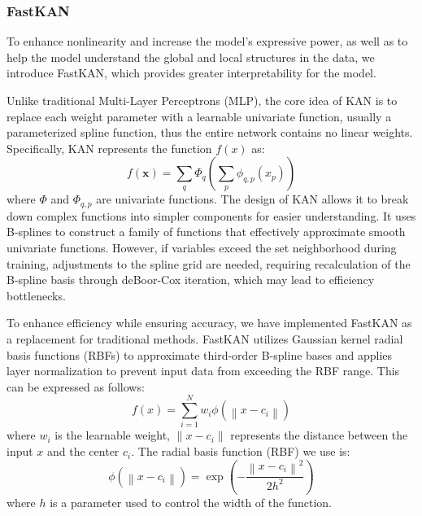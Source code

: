 \documentclass[a4paper,fleqn]{cas-dc}
\begin{document}
\subsubsection{FastKAN}
To enhance nonlinearity and increase the model's expressive power, as well as to help the model understand the global and local structures in the data, we introduce FastKAN\cite{li2024kolmogorovarnoldnetworksradialbasis}, which provides greater interpretability for the model.

Unlike traditional Multi-Layer Perceptrons (MLP)\cite{taud2018multilayer}, the core idea of KAN\cite{liu2024kankolmogorovarnoldnetworks} is to replace each weight parameter with a learnable univariate function, usually a parameterized spline function, thus the entire network contains no linear weights. Specifically, KAN represents the function \( f(x) \) as:
\begin{equation}
	f(\mathbf{x}) = \sum_q \Phi_q \left( \sum_p \phi_{q,p}(x_p) \right)
\end{equation} 
where \( \Phi \) and \( \Phi_{q,p} \) are univariate functions.
The design of KAN allows it to break down complex functions into simpler components for easier understanding. It uses B-splines to construct a family of functions that effectively approximate smooth univariate functions. However, if variables exceed the set neighborhood during training, adjustments to the spline grid are needed, requiring recalculation of the B-spline\cite{de1972calculating} basis through deBoor-Cox iteration, which may lead to efficiency bottlenecks.

To enhance efficiency while ensuring accuracy, we have implemented FastKAN as a replacement for traditional methods. FastKAN utilizes Gaussian kernel radial basis functions (RBFs)\cite{buhmann2000radial} to approximate third-order B-spline bases and applies layer normalization to prevent input data from exceeding the RBF range.
This can be expressed as follows:
\begin{equation}
	f(x) = \sum_{i=1}^{N} w_{i} \phi\left( \left\| x - c_{i} \right\| \right)
\end{equation}
where \( w_i \) is the learnable weight, \(\| x - c_i \|\) represents the distance between the input \(x\) and the center \(c_i\). The radial basis function (RBF) we use is:
\begin{equation}
	\phi( \left\| x - c_{i} \right\|) = \exp\left(-\frac{ \left\| x - c_{i} \right\|^2}{2h^2}\right)
\end{equation}
where \(h\) is a parameter used to control the width of the function.
\end{document}
